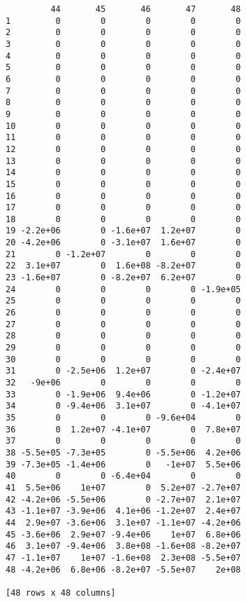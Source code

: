 \documentclass{article}
\begin{document}
\begin{verbatim}
         44       45       46       47       48  
1         0        0        0        0        0  
2         0        0        0        0        0  
3         0        0        0        0        0  
4         0        0        0        0        0  
5         0        0        0        0        0  
6         0        0        0        0        0  
7         0        0        0        0        0  
8         0        0        0        0        0  
9         0        0        0        0        0  
10        0        0        0        0        0  
11        0        0        0        0        0  
12        0        0        0        0        0  
13        0        0        0        0        0  
14        0        0        0        0        0  
15        0        0        0        0        0  
16        0        0        0        0        0  
17        0        0        0        0        0  
18        0        0        0        0        0  
19 -2.2e+06        0 -1.6e+07  1.2e+07        0  
20 -4.2e+06        0 -3.1e+07  1.6e+07        0  
21        0 -1.2e+07        0        0        0  
22  3.1e+07        0  1.6e+08 -8.2e+07        0  
23 -1.6e+07        0 -8.2e+07  6.2e+07        0  
24        0        0        0        0 -1.9e+05  
25        0        0        0        0        0  
26        0        0        0        0        0  
27        0        0        0        0        0  
28        0        0        0        0        0  
29        0        0        0        0        0  
30        0        0        0        0        0  
31        0 -2.5e+06  1.2e+07        0 -2.4e+07  
32   -9e+06        0        0        0        0  
33        0 -1.9e+06  9.4e+06        0 -1.2e+07  
34        0 -9.4e+06  3.1e+07        0 -4.1e+07  
35        0        0        0 -9.6e+04        0  
36        0  1.2e+07 -4.1e+07        0  7.8e+07  
37        0        0        0        0        0  
38 -5.5e+05 -7.3e+05        0 -5.5e+06  4.2e+06  
39 -7.3e+05 -1.4e+06        0   -1e+07  5.5e+06  
40        0        0 -6.4e+04        0        0  
41  5.5e+06    1e+07        0  5.2e+07 -2.7e+07  
42 -4.2e+06 -5.5e+06        0 -2.7e+07  2.1e+07  
43 -1.1e+07 -3.9e+06  4.1e+06 -1.2e+07  2.4e+07  
44  2.9e+07 -3.6e+06  3.1e+07 -1.1e+07 -4.2e+06  
45 -3.6e+06  2.9e+07 -9.4e+06    1e+07  6.8e+06  
46  3.1e+07 -9.4e+06  3.8e+08 -1.6e+08 -8.2e+07  
47 -1.1e+07    1e+07 -1.6e+08  2.3e+08 -5.5e+07  
48 -4.2e+06  6.8e+06 -8.2e+07 -5.5e+07    2e+08  

[48 rows x 48 columns]
    \end{verbatim}
\end{document}

